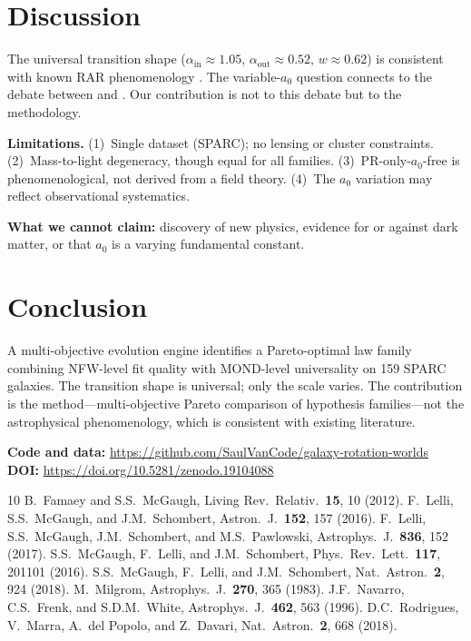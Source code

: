 \documentclass[aps,prl,twocolumn,superscriptaddress,showpacs]{revtex4-2}
\begin{document}
\section{Discussion}\label{sec:discussion}

The universal transition shape ($\alpha_\mathrm{in}\approx1.05$, $\alpha_\mathrm{out}\approx0.52$, $w\approx0.62$) is consistent with known RAR phenomenology \citep{McGaugh2016,Lelli2017}. The variable-$a_0$ question connects to the debate between \citet{Rodrigues2018} and \citet{McGaugh2018}. Our contribution is not to this debate but to the methodology.

\textbf{Limitations.} (1)~Single dataset (SPARC); no lensing or cluster constraints. (2)~Mass-to-light degeneracy, though equal for all families. (3)~PR-only-$a_0$-free is phenomenological, not derived from a field theory. (4)~The $a_0$ variation may reflect observational systematics.

\textbf{What we cannot claim:} discovery of new physics, evidence for or against dark matter, or that $a_0$ is a varying fundamental constant.

\section{Conclusion}\label{sec:conclusion}

A multi-objective evolution engine identifies a Pareto-optimal law family combining NFW-level fit quality with MOND-level universality on 159 SPARC galaxies. The transition shape is universal; only the scale varies. The contribution is the method---multi-objective Pareto comparison of hypothesis families---not the astrophysical phenomenology, which is consistent with existing literature.

\vspace{0.5em}
\noindent\textbf{Code and data:} \url{https://github.com/SaulVanCode/galaxy-rotation-worlds}\\
\textbf{DOI:} \url{https://doi.org/10.5281/zenodo.19104088}

\begin{thebibliography}{10}
 B.~Famaey and S.S.~McGaugh, Living Rev.\ Relativ.\ \textbf{15}, 10 (2012).
 F.~Lelli, S.S.~McGaugh, and J.M.~Schombert, Astron.\ J.\ \textbf{152}, 157 (2016).
 F.~Lelli, S.S.~McGaugh, J.M.~Schombert, and M.S.~Pawlowski, Astrophys.\ J.\ \textbf{836}, 152 (2017).
 S.S.~McGaugh, F.~Lelli, and J.M.~Schombert, Phys.\ Rev.\ Lett.\ \textbf{117}, 201101 (2016).
 S.S.~McGaugh, F.~Lelli, and J.M.~Schombert, Nat.\ Astron.\ \textbf{2}, 924 (2018).
 M.~Milgrom, Astrophys.\ J.\ \textbf{270}, 365 (1983).
 J.F.~Navarro, C.S.~Frenk, and S.D.M.~White, Astrophys.\ J.\ \textbf{462}, 563 (1996).
 D.C.~Rodrigues, V.~Marra, A.~del Popolo, and Z.~Davari, Nat.\ Astron.\ \textbf{2}, 668 (2018).
\end{thebibliography}
\end{document}
